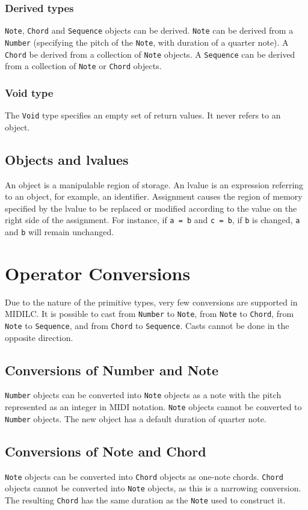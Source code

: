 \documentclass[12pt,A4]{book}
\begin{document}
\subsubsection{Derived types}
\verb|Note|, \verb|Chord| and \verb|Sequence| objects can be derived. \verb|Note| can be derived from a \verb|Number| (specifying the pitch of the \verb|Note|, with duration of a quarter note). A \verb|Chord| be derived from a collection of \verb|Note| objects. A \verb|Sequence| can be derived from a collection of \verb|Note| or \verb|Chord| objects.
\subsubsection{Void type}
The \verb|Void| type specifies an empty set of return values. It never refers to an object.
\subsection{Objects and lvalues}
An object is a manipulable region of storage. An lvalue is an expression referring to an object, for example, an identifier.  Assignment causes the region of memory specified by the lvalue to be replaced or modified according to the value on the right side of the assignment.  For instance, if \verb|a = b| and \verb|c = b|, if \verb|b| is changed, \verb|a| and \verb|b| will remain unchanged.
\section{Operator Conversions}
Due to the nature of the primitive types, very few conversions are supported in MIDILC. It is possible to cast from \verb|Number| to \verb|Note|, from \verb|Note| to \verb|Chord|, from \verb|Note| to \verb|Sequence|, and from \verb|Chord| to \verb|Sequence|. Casts cannot be done in the opposite direction.
\subsection{Conversions of Number and Note}
\verb|Number| objects can be converted into \verb|Note| objects as a note with the pitch represented as an integer in MIDI notation. \verb|Note| objects cannot be converted to \verb|Number| objects. The new object has a default duration of quarter note.
\subsection{Conversions of Note and Chord}
\verb|Note| objects can be converted into \verb|Chord| objects as one-note chords. \verb|Chord| objects cannot be converted into \verb|Note| objects, as this is a narrowing conversion. The resulting \verb|Chord| has the same duration as the \verb|Note| used to construct it.
\end{document}
